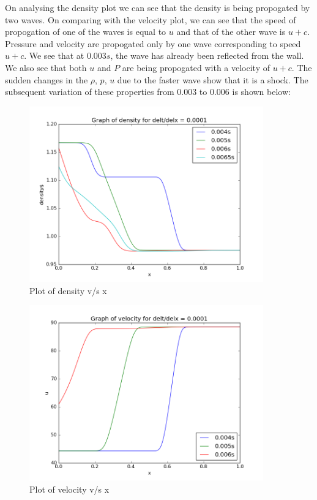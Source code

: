 \documentclass[11pt, a4paper]{article}
\begin{document}
On analysing the density plot we can see that the density is being propogated by two waves. On comparing with the velocity plot,
we can see that the speed of propogation of one of the waves is equal to $u$ and that of the other wave is $u + c$. Pressure and
velocity are propogated only by one wave corresponding to speed $u+c$. We see
that at $0.003s$, the wave has already been reflected from the wall. We also see that both $u$ and $P$ are being propogated 
with a velocity of $u+c$. The sudden changes in the $\rho$, $p$, $u$ due to the faster wave show that it is a shock.
The subsequent variation of these properties from $0.003$ to $0.006$ is shown below:
\begin{figure}[H]
 \centering
 \includegraphics[width = 0.9\textwidth]{FTCS2_1_2.png}
 \caption{Plot of density v/s x}
\end{figure}
\begin{figure}[H]
 \centering
 \includegraphics[width = 0.9\textwidth]{FTCS2_1_5.png}
 \caption{Plot of velocity v/s x}
\end{figure}
\end{document}
